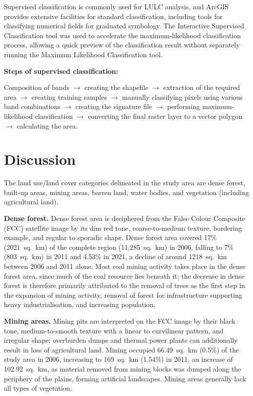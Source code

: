 \documentclass[11pt]{article}
\begin{document}
Supervised classification is commonly used for LULC analysis, and ArcGIS provides extensive
facilities for standard classification, including tools for classifying numerical fields for
graduated symbology. The Interactive Supervised Classification tool was used to accelerate the
maximum-likelihood classification process, allowing a quick preview of the classification result
without separately running the Maximum Likelihood Classification tool.

\textbf{Steps of supervised classification:}
\begin{center}
\small
Composition of bands $\rightarrow$ creating the shapefile $\rightarrow$ extraction of the
required area $\rightarrow$ creating training samples $\rightarrow$ manually classifying pixels
using various band combinations $\rightarrow$ creating the signature file $\rightarrow$
performing maximum-likelihood classification $\rightarrow$ converting the final raster layer to
a vector polygon $\rightarrow$ calculating the area.
\end{center}

\section{Discussion}

The land use/land cover categories delineated in the study area are dense forest, built-up
areas, mining areas, barren land, water bodies, and vegetation (including agricultural land).

\textbf{Dense forest.} Dense forest area is deciphered from the False Colour Composite (FCC)
satellite image by its dim red tone, coarse-to-medium texture, bordering example, and regular to
sporadic shape. Dense forest area covered 17\% (2021~sq.\ km) of the complete region
(11{,}285~sq.\ km) in 2006, falling to 7\% (803~sq.\ km) in 2011 and 4.53\% in 2021, a decline
of around 1218~sq.\ km between 2006 and 2011 alone. Most coal mining activity takes place in the
dense forest area, since much of the coal resource lies beneath it; the decrease in dense forest
is therefore primarily attributed to the removal of trees as the first step in the expansion of
mining activity, removal of forest for infrastructure supporting heavy industrialisation, and
increasing population.

\textbf{Mining areas.} Mining pits are interpreted on the FCC image by their black tone,
medium-to-smooth texture with a linear to curvilinear pattern, and irregular shape; overburden
dumps and thermal power plants can additionally result in loss of agricultural land. Mining
occupied 66.49~sq.\ km (0.5\%) of the study area in 2006, increasing to 169~sq.\ km (1.54\%) in
2011, an increase of 102.92~sq.\ km, as material removed from mining blocks was dumped along
the periphery of the plains, forming artificial landscapes. Mining areas generally lack all
types of vegetation.
\end{document}

